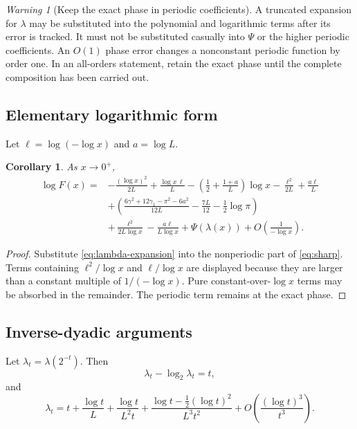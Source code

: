 \documentclass[11pt]{article}
\newtheorem{corollary}[theorem]{Corollary}
\theoremstyle{definition}
\theoremstyle{remark}
\newtheorem{warning}[theorem]{Warning}
\begin{document}
\begin{warning}[Keep the exact phase in periodic coefficients]
A truncated expansion for $\lambda$ may be substituted into the polynomial and logarithmic terms after its error is tracked.  It must not be substituted casually into $\Psi$ or the higher periodic coefficients.  An $O(1)$ phase error changes a nonconstant periodic function by order one.  In an all-orders statement, retain the exact phase until the complete composition has been carried out.
\end{warning}

\subsection{Elementary logarithmic form}
Let $\ell=\log(-\log x)$ and $a=\log L$.
\begin{corollary}\label{cor:expanded-log}
As $x\to0^+$,
\begin{equation}\label{eq:expanded-log}
\begin{aligned}
 \log F(x)={}&-\frac{(\log x)^2}{2L}
 +\frac{\log x\,\ell}{L}
 -\left(\frac12+\frac{1+a}{L}\right)\log x
 -\frac{\ell^2}{2L}+\frac{a\ell}{L}\\
 &+\left(\frac{6\gamma^2+12\gamma_1-\pi^2-6a^2}{12L}
 -\frac{7L}{12}-\frac12\log\pi\right)\\
 &+\frac{\ell^2}{2L\log x}-\frac{a\ell}{L\log x}
 +\Psi(\lambda(x))+O\!\left(\frac1{-\log x}\right).
\end{aligned}
\end{equation}
\end{corollary}
\begin{proof}
Substitute \eqref{eq:lambda-expansion} into the nonperiodic part of \eqref{eq:sharp}.  Terms containing $\ell^2/\log x$ and $\ell/\log x$ are displayed because they are larger than a constant multiple of $1/(-\log x)$.  Pure constant-over-$\log x$ terms may be absorbed in the remainder.  The periodic term remains at the exact phase.
\end{proof}

\subsection{Inverse-dyadic arguments}
Let $\lambda_t=\lambda(2^{-t})$.  Then
\begin{equation}\label{eq:lambda-t-equation}
 \lambda_t-\log_2\lambda_t=t,
\end{equation}
and
\begin{equation}\label{eq:lambda-t-expansion}
 \lambda_t=t+\frac{\log t}{L}+\frac{\log t}{L^2t}
 +\frac{\log t-\frac12(\log t)^2}{L^3t^2}
 +O\!\left(\frac{(\log t)^3}{t^3}\right).
\end{equation}
\end{document}
